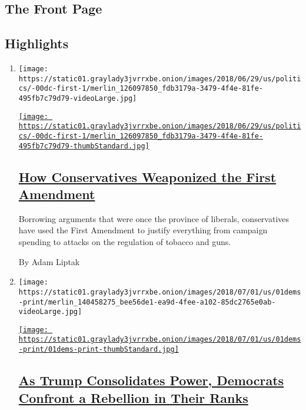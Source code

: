 \hypertarget{the-front-page}{%
\subsection{The Front Page}\label{the-front-page}}

\hypertarget{highlights}{%
\subsection{Highlights}\label{highlights}}

\begin{enumerate}
\def\labelenumi{\arabic{enumi}.}
\item
  \texttt{[image: https://static01.graylady3jvrrxbe.onion/images/2018/06/29/us/politics/-00dc-first-1/merlin\_126097850\_fdb3179a-3479-4f4e-81fe-495fb7c79d79-videoLarge.jpg]}

  \href{/2018/06/30/us/politics/first-amendment-conservatives-supreme-court.html}{\texttt{[image: https://static01.graylady3jvrrxbe.onion/images/2018/06/29/us/politics/-00dc-first-1/merlin\_126097850\_fdb3179a-3479-4f4e-81fe-495fb7c79d79-thumbStandard.jpg]}}

  \hypertarget{how-conservatives-weaponized-the-first-amendment}{%
  \subsection{\texorpdfstring{\href{/2018/06/30/us/politics/first-amendment-conservatives-supreme-court.html}{How
  Conservatives Weaponized the First
  Amendment}}{How Conservatives Weaponized the First Amendment}}\label{how-conservatives-weaponized-the-first-amendment}}

  Borrowing arguments that were once the province of liberals,
  conservatives have used the First Amendment to justify everything from
  campaign spending to attacks on the regulation of tobacco and guns.

  By Adam Liptak
\item
  \texttt{[image: https://static01.graylady3jvrrxbe.onion/images/2018/07/01/us/01dems-print/merlin\_140458275\_bee56de1-ea9d-4fee-a102-85dc2765e0ab-videoLarge.jpg]}

  \href{/2018/06/30/us/politics/midterm-elections-democratic-party.html}{\texttt{[image: https://static01.graylady3jvrrxbe.onion/images/2018/07/01/us/01dems-print/01dems-print-thumbStandard.jpg]}}

  \hypertarget{as-trump-consolidates-power-democrats-confront-a-rebellion-in-their-ranks}{%
  \subsection{\texorpdfstring{\href{/2018/06/30/us/politics/midterm-elections-democratic-party.html}{As
  Trump Consolidates Power, Democrats Confront a Rebellion in Their
  Ranks}}{As Trump Consolidates Power, Democrats Confront a Rebellion in Their Ranks}}\label{as-trump-consolidates-power-democrats-confront-a-rebellion-in-their-ranks}}


\end{enumerate}
